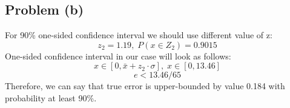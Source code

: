 \subsection*{Problem (b)}

For 90\% one-sided confidence interval we should use different value of z:
 \[
z_2=1.19,\; P(x\in Z_2)=0.9015
\]
One-sided confidence interval in our case will look as follows:
 \[
x\in [0, \bar{x}+z_2\cdot\sigma],\;
x\in [0, 13.46]
\]
 \[
e < 13.46/65
\]
Therefore, we can say that true error is upper-bounded by value 0.184 with probability at least 90\%.
